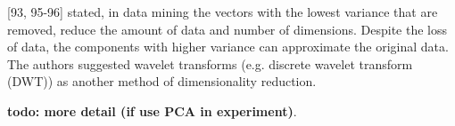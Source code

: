 \textcite{han2011data}[93, 95-96] stated, in data mining the vectors with the lowest variance that are removed, reduce the amount of data and number of dimensions. Despite the loss of data, the components with higher variance can approximate the original data. The authors suggested wavelet transforms (e.g. discrete wavelet transform (DWT)) as another method of dimensionality reduction.


\textbf{todo: more detail (if use PCA in experiment)}.




